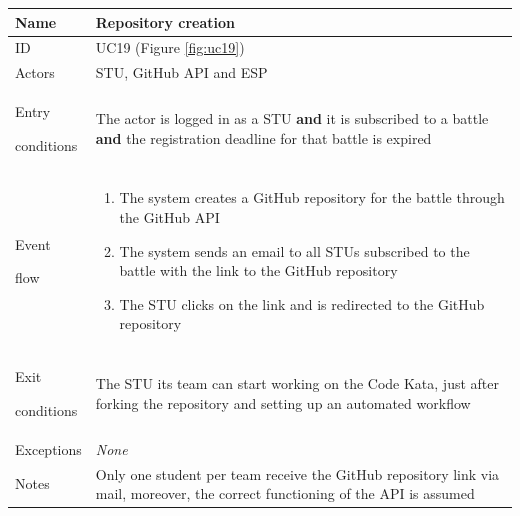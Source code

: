 \begin{center}
    \def\arraystretch{1.5}
    \begin{tabular}{| m{2cm} | m{10cm}|}
        \hline
        Name                  & Repository creation                                                                                                                         \\ \hline
        ID                    & UC19 (Figure \ref{fig:uc19})                                                                                                                \\ \hline
        Actors                & STU, GitHub API and ESP                                                                                                                     \\ \hline
        Entry \par conditions & The actor is logged in as a STU \textbf{and} it is subscribed to a battle \textbf{and} the registration deadline for that battle is expired \\ \hline
        Event \par flow       & \begin{enumerate}
                                    \item The system creates a GitHub repository for the battle through the GitHub API
                                    \item The system sends an email to all STUs subscribed to the battle with the link to the GitHub repository
                                    \item The STU clicks on the link and is redirected to the GitHub repository
                                \end{enumerate}                                  \\ \hline
        Exit \par conditions  & The STU its team can start working on the Code Kata, just after forking the repository and setting up an automated workflow                 \\ \hline
        Exceptions            & \textit{None}                                                                                                                               \\ \hline
        Notes                 & Only one student per team receive the GitHub repository link via mail, moreover, the correct functioning of the API is assumed              \\ \hline
    \end{tabular}
\end{center}

